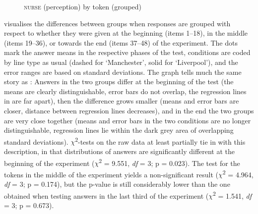 \begin{figure}
	
		\resizebox{.49\linewidth}{!}{} 
	\caption{\textsc{nurse} (perception) by token (grouped)}
	\label{fig.line.nurse.ext.token}
\end{figure}

 visualises the differences between  groups when responses are grouped with respect to whether they were given at the beginning (items 1--18), in the middle (items 19--36), or towards the end (items 37--48) of the experiment.
The dots mark the answer means in the respective phases of the test,  conditions are coded by line type as usual (dashed for `Manchester', solid for `Liverpool'), and the error ranges are based on standard deviations.
The graph tells much the same story as : Answers in the two groups differ at the beginning of the test (the means are clearly distinguishable, error bars do not overlap, the regression lines in  are far apart), then the difference grows smaller (means and error bars are closer, distance between regression lines decreases), and in the end the two groups are very close together (means and error bars in the two conditions are no longer distinguishable, regression lines lie within the dark grey area of overlapping standard deviations).
\(\chi\)\textsuperscript{2}-tests on the raw data at least partially tie in with this description, in that distributions of answers are significantly different at the beginning of the experiment (\(\chi\)\textsuperscript{2} = 9.551, \emph{df} = 3; p = 0.023).
The test for the tokens in the middle of the experiment yields a non-significant result (\(\chi\)\textsuperscript{2} = 4.964, \emph{df} = 3; p = 0.174), but the p-value is still considerably lower than the one obtained when testing answers in the last third of the experiment (\(\chi\)\textsuperscript{2} = 1.541, \emph{df} = 3; p = 0.673).


